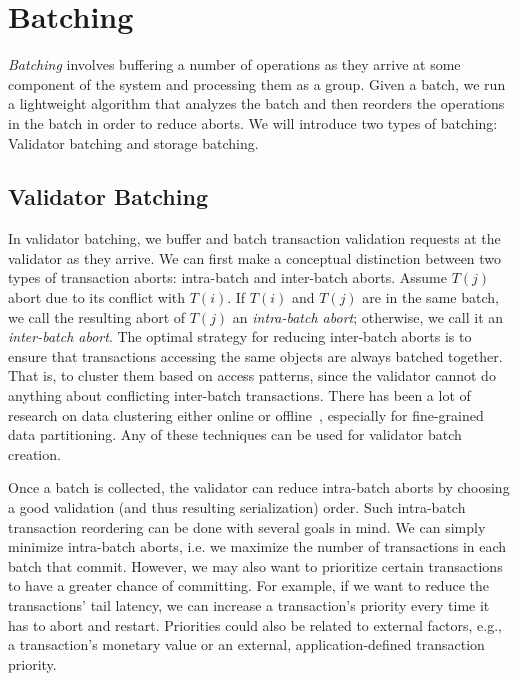 \section{Batching}\label{sec:overview}


\emph{Batching} involves buffering a number of operations as they arrive at some component of the system and processing them as a group. 
Given a batch, we run a lightweight algorithm that analyzes the batch and then reorders the operations in the batch in order to reduce aborts. We will introduce two types of batching: Validator batching and storage batching.


\subsection{Validator Batching}\label{subsec:overview:validator}

In validator batching, we buffer and batch transaction validation requests at the validator as they arrive.
We can first make a conceptual distinction between two types of transaction aborts: intra-batch and inter-batch aborts. Assume $T(j)$ abort due to its conflict with $T(i)$. If $T(i)$ and $T(j)$ are in the same batch, we call the resulting abort of $T(j)$ an \emph{intra-batch abort}; otherwise, we call it an \emph{inter-batch abort}.
The optimal strategy for reducing inter-batch aborts is to ensure that transactions accessing the same objects are always batched together. That is, to cluster them based on access patterns, since  the validator cannot do anything about conflicting inter-batch transactions. 
There has been a lot of research on data clustering either online or offline~\cite{elmore2015squall, pavlo2012skew}, especially for fine-grained data partitioning. Any of these techniques can be used for validator batch creation.

Once a batch is collected, the validator can reduce intra-batch aborts by choosing a good validation (and thus resulting serialization) order.
Such intra-batch transaction reordering can be done with several goals in mind. We can simply minimize intra-batch aborts, i.e. we maximize the number of transactions in each batch that commit. However, we may also want to prioritize certain transactions to have a greater chance of committing. For example, if we want to reduce the transactions' tail latency, we can increase a transaction's priority every time it has to abort and restart. Priorities could also be related to external factors, e.g., a transaction's monetary value or an external, application-defined transaction priority. 

